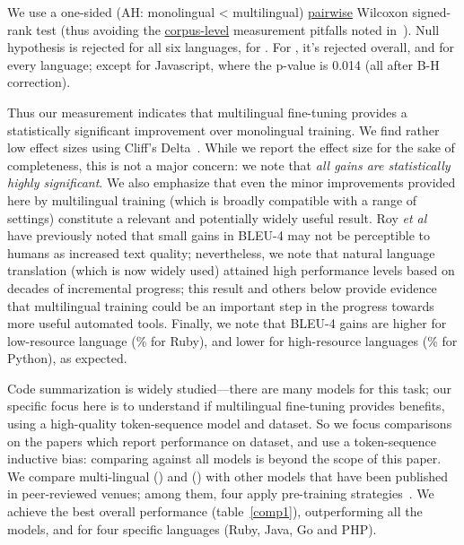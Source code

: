 We use a one-sided (AH: monolingual < multilingual) \underline{pairwise} Wilcoxon signed-rank test
(thus avoiding the \underline{corpus-level} measurement pitfalls noted in~\cite{roy2021reassessing}). 
Null hypothesis is rejected for all six languages, for \cbert. For \gcbert, it's rejected overall, and for every language;
except for Javascript, where the p-value is 0.014 (all after B-H correction). 

Thus our measurement indicates that multilingual fine-tuning 
provides a statistically significant improvement over monolingual training. We find rather low  effect sizes using Cliff's Delta~\cite{macbeth2011cliff}. 
While we report the effect size for the sake of completeness, this is not a major concern: 
we note that \emph{all gains are statistically highly significant}. 
We also emphasize that even the minor 
improvements provided here by multilingual training (which is broadly compatible with a range of settings) constitute a relevant and potentially widely useful result. 
Roy \emph{et al}~\cite{roy2021reassessing} have previously noted that small gains in BLEU-4 may not be perceptible to humans as
increased text quality; nevertheless, we note that  natural language translation (which is now widely used) attained
 high performance levels based on decades of incremental progress; this result and others below
provide evidence that  multilingual training could be an important step in the progress towards more useful automated
tools.  Finally, we note 
 that BLEU-4 gains are higher for low-resource language (\% for Ruby), and lower for high-resource languages (\% for Python), as expected. 




Code summarization is widely studied---there are many models for this task; our specific focus 
here is to understand if multilingual fine-tuning provides benefits, using a high-quality token-sequence model and dataset. 
So we focus comparisons on the papers which report performance on \cxglue dataset, and use a token-sequence inductive bias:
comparing against all models is beyond the scope of this paper. 
We compare multi-lingual \cbert (\mlcbert) and \gcbert (\mlgcbert) with other models that  have been published in peer-reviewed venues; 
among them, four apply pre-training strategies~\cite{liu2019roberta,feng2020codebert,ahmad-etal-2021-unified,qi2021prophetnet}. 
We achieve the best overall performance (table~\ref{comp1}), outperforming all the models, and  for four specific languages (\ie Ruby, Java, Go and PHP). 


